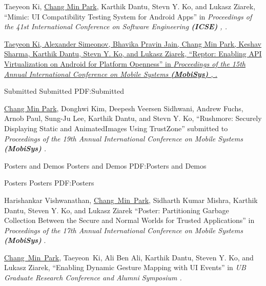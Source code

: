 \documentclass[letterpaper,MMMyyyy,nonstopmode]{simpleresumecv}
\begin{document}
\begin{Body}
\Gap
\NumberedItem{[2]}
Taeyeon Ki, \underline{Chang Min Park}, Karthik Dantu, Stevn Y. Ko, and Lukasz Ziarek, 
``Mimic: UI Compatibility Testing System for Android Apps'' in
\textit{Proceedings of the 41st International Conference on Software Engineering \textbf{(ICSE)}
, .}

\Gap
\NumberedItem{[3]}
\href{https://dl.acm.org/citation.cfm?id=3081341}
{Taeyeon Ki, Alexander Simeonov, Bhavika Pravin Jain, \underline{Chang Min Park},
Keshav Sharma, Karthik Dantu, Stevn Y. Ko, and Lukasz Ziarek, 
``Reptor: Enabling API Virtualization on Android for Platform Openness'' in 
\textit{Proceedings of the 15th Annual International Conference on Mobile Systems \textbf{(MobiSys)}
, }.}



\SubSection
{Submitted}
{Submitted}
{PDF:Submitted}

\begingroup
\renewcommand{\MaxNumberedItem}{[88]}

\Gap
\NumberedItem{[1]}
\underline{Chang Min Park}, Donghwi Kim, Deepesh Veersen Sidhwani, Andrew Fuchs, Arnob Paul,
Sung-Ju Lee, Karthik Dantu, and Stevn Y. Ko,
``Rushmore: Securely Displaying Static and AnimatedImages Using TrustZone'' submitted to
\textit{Proceedings of the 19th Annual International Conference on Mobile Systems \textbf{(MobiSys)}
.}



\Section
{Posters and Demos}
{Posters and Demos}
{PDF:Posters and Demos}

\SubSection
{Posters}
{Posters}
{PDF:Posters}

\begingroup
\renewcommand{\MaxNumberedItem}{[88]}

\BigGap
\NumberedItem{[1]}
Harishankar Vishwanathan, \underline{Chang~Min~Park}, Sidharth Kumar Mishra, Karthik Dantu, 
Steven Y. Ko, and Lukasz Ziarek
``Poster: Partitioning Garbage Collection Between the Secure and Normal Worlds for Trusted Applications'' in
\textit{Proceedings of the 17th Annual International Conference on Mobile Systems \textbf{(MobiSys)}
}.

\Gap
\NumberedItem{[2]}
\underline{Chang~Min~Park}, Taeyeon~Ki, Ali Ben Ali, Karthik Dantu, Steven Y. Ko, 
and Lukasz Ziarek, 
``Enabling Dynamic Gesture Mapping with UI Events'' in
\textit{UB Graduate Research Conference and Alumni Symposium
.}



\end{Body}
\end{document}
